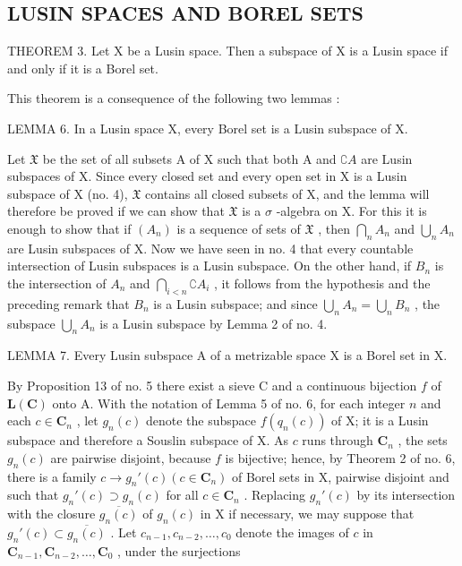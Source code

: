 \subsection{LUSIN SPACES AND BOREL SETS}

THEOREM 3. Let X be a Lusin space. Then a subspace of X is a Lusin space if and only if it is a Borel set.

This theorem is a consequence of the following two lemmas :

LEMMA 6. In a Lusin space X, every Borel set is a Lusin subspace of X.

Let \(\mathfrak{X}\) be the set of all subsets A of X such that both A and \(\complement A\) are Lusin subspaces of X. Since every closed set and every open set in X is a Lusin subspace of X (no. 4), \(\mathfrak{X}\) contains all closed subsets of X, and the lemma will therefore be proved if we can show that \(\mathfrak{X}\) is a \(\sigma\) -algebra on X. For this it is enough to show that if \((A_n)\) is a sequence of sets of \(\mathfrak{X}\) , then \(\bigcap_{n} A_n\) and \(\bigcup_{n} A_n\) are Lusin subspaces of X. Now we have seen in no. 4 that every countable intersection of Lusin subspaces is a Lusin subspace. On the other hand, if \(B_n\) is the intersection of \(A_n\) and \(\bigcap_{i < n} \complement A_i\) , it follows from the hypothesis and the preceding remark that \(B_n\) is a Lusin subspace; and since \(\bigcup_{n} A_n = \bigcup_{n} B_n\) , the subspace \(\bigcup_{n} A_n\) is a Lusin subspace by Lemma 2 of no. 4.

LEMMA 7. Every Lusin subspace A of a metrizable space X is a Borel set in X.

By Proposition 13 of no. 5 there exist a sieve C and a continuous bijection \(f\) of \(\mathbf{L}(\mathbf{C})\) onto A. With the notation of Lemma 5 of no. 6, for each integer \(n\) and each \(c \in \mathbf{C}_n\) , let \(g_n(c)\) denote the subspace \(f(q_n(c))\) of X; it is a Lusin subspace and therefore a Souslin subspace of X. As \(c\) runs through \(\mathbf{C}_n\) , the sets \(g_n(c)\) are pairwise disjoint, because \(f\) is bijective; hence, by Theorem 2 of no. 6, there is a family \(c \to g_n'(c) (c \in \mathbf{C}_n)\) of Borel sets in X, pairwise disjoint and such that \(g_n'(c) \supset g_n(c)\) for all \(c \in \mathbf{C}_n\) . Replacing \(g_n'(c)\) by its intersection with the closure \(\overline{g_n(c)}\) of \(g_n(c)\) in X if necessary, we may suppose that \(g_n'(c) \subset \overline{g_n(c)}\) . Let \(c_{n-1}, c_{n-2}, \ldots, c_0\) denote the images of \(c\) in \(\mathbf{C}_{n-1}, \mathbf{C}_{n-2}, \ldots, \mathbf{C}_0\) , under the surjections

